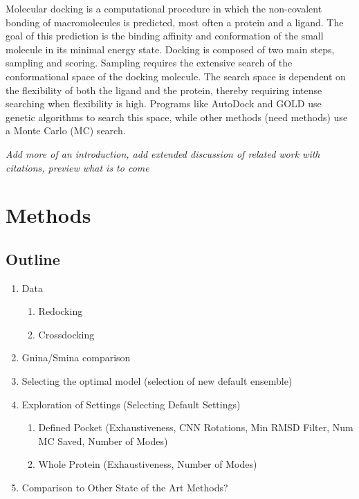 \documentclass[journal=jcisd8,manuscript=article]{achemso}
\begin{document}
Molecular docking is a computational procedure in which the non-covalent bonding of macromolecules is predicted, most often a protein and a ligand. The goal of this prediction is the binding affinity and conformation of the small molecule in its minimal energy state. Docking is composed of two main steps, sampling and scoring. Sampling requires the extensive search of the conformational space of the docking molecule. The search space is dependent on the flexibility of both the ligand and the protein, thereby requiring intense searching when flexibility is high. Programs like AutoDock and GOLD use genetic algorithms to search this space, while other methods (need methods) use a Monte Carlo (MC) search.

\textit{Add more of an introduction, add extended discussion of related work with citations, preview what is to come}

\section{Methods}

\subsection{Outline}
\begin{enumerate}
    \item Data
    \begin{enumerate}
        \item Redocking
        \item Crossdocking
    \end{enumerate}
    \item Gnina/Smina comparison
    \item Selecting the optimal model (selection of new default ensemble)
    \item Exploration of Settings (Selecting Default Settings)
    \begin{enumerate}
        \item Defined Pocket (Exhaustiveness, CNN Rotations, Min RMSD Filter, Num MC Saved, Number of Modes)
        \item Whole Protein (Exhaustiveness, Number of Modes)
    \end{enumerate}
    \item Comparison to Other State of the Art Methods?
\end{enumerate}
\end{document}
